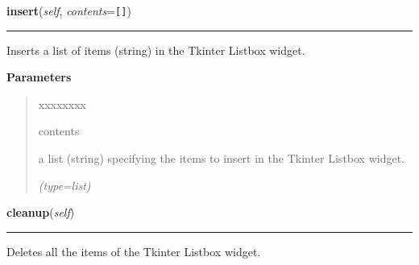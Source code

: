 \hspace{.8\funcindent}\begin{boxedminipage}{\funcwidth}

    \raggedright \textbf{insert}(\textit{self}, \textit{contents}={\tt []})

    \vspace{-1.5ex}

    \rule{\textwidth}{0.5\fboxrule}
\setlength{\parskip}{2ex}
    Inserts a list of items (string) in the Tkinter Listbox widget.

\setlength{\parskip}{1ex}
      \textbf{Parameters}
      \vspace{-1ex}

      \begin{quote}
        \begin{Ventry}{xxxxxxxx}

          \item[contents]

          a list (string) specifying the items to insert in the Tkinter 
          Listbox widget.

            {\it (type=list)}

        \end{Ventry}

      \end{quote}

    \end{boxedminipage}

    \label{nMOLDYN:GUI:Widgets:ComboListbox:cleanup}

    \vspace{0.5ex}

\hspace{.8\funcindent}\begin{boxedminipage}{\funcwidth}

    \raggedright \textbf{cleanup}(\textit{self})

    \vspace{-1.5ex}

    \rule{\textwidth}{0.5\fboxrule}
\setlength{\parskip}{2ex}
    Deletes all the items of the Tkinter Listbox widget.

\setlength{\parskip}{1ex}
    \end{boxedminipage}

    \label{nMOLDYN:GUI:Widgets:ComboListbox:onListboxEntrySelection}

